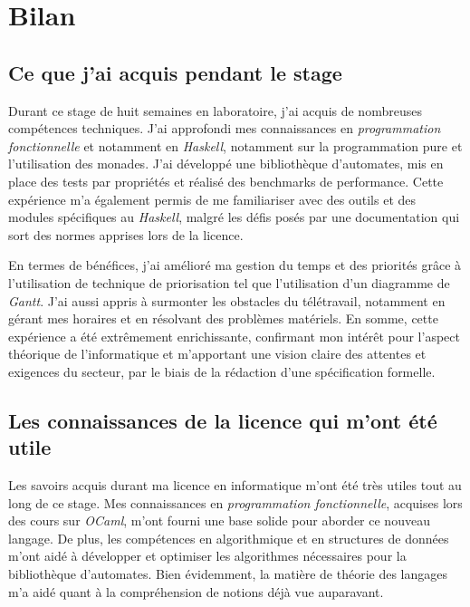 \section{Bilan}

\subsection{Ce que j'ai acquis pendant le stage}

Durant ce stage de huit semaines en laboratoire, j'ai acquis de nombreuses 
compétences techniques. J'ai approfondi mes connaissances en 
\textit{programmation fonctionnelle} et notamment en \textit{Haskell}, notamment 
sur la programmation pure et l'utilisation des monades. J'ai développé une 
bibliothèque d'automates, mis en place des tests par propriétés et réalisé des 
benchmarks de performance. Cette expérience m'a également permis de me 
familiariser avec des outils et des modules spécifiques au \textit{Haskell}, 
malgré les défis posés par une documentation qui sort des normes apprises lors 
de la licence. 

\vphantom{}

En termes de bénéfices, j'ai amélioré ma gestion du temps et des priorités grâce 
à l'utilisation de technique de priorisation tel que l'utilisation d'un 
diagramme de \textit{Gantt}. J'ai aussi appris à surmonter les obstacles du 
télétravail, notamment en gérant mes horaires et en résolvant des problèmes 
matériels. En somme, cette expérience a été extrêmement enrichissante, 
confirmant mon intérêt pour l'aspect théorique de l'informatique et m'apportant 
une vision claire des attentes et exigences du secteur, par le biais de la 
rédaction d'une spécification formelle.

\subsection{Les connaissances de la licence qui m'ont été utile}

Les savoirs acquis durant ma licence en informatique m'ont été très utiles tout 
au long de ce stage. Mes connaissances en \textit{programmation fonctionnelle}, 
acquises lors des cours sur \textit{OCaml}, m'ont fourni une base solide pour 
aborder ce nouveau langage. De plus, les compétences en algorithmique et en 
structures de données m'ont aidé à développer et optimiser les algorithmes 
nécessaires pour la bibliothèque d'automates. Bien évidemment, la matière de 
théorie des langages m’a aidé quant à la compréhension de notions déjà vue 
auparavant.

